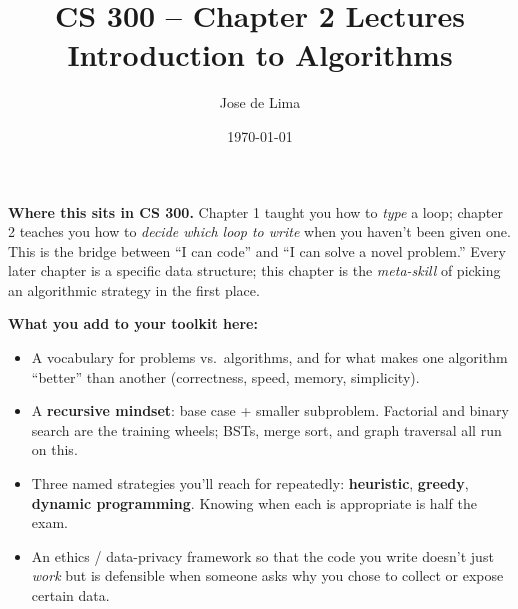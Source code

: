 \documentclass[11pt]{article}
\title{CS 300 -- Chapter 2 Lectures\\\large Introduction to Algorithms}
\author{Jose de Lima}
\date{\today}
\begin{document}
\maketitle

\begin{ideabox}
\textbf{Where this sits in CS 300.} Chapter 1 taught you how to \emph{type}
a loop; chapter 2 teaches you how to \emph{decide which loop to write} when
you haven't been given one. This is the bridge between ``I can code'' and
``I can solve a novel problem.'' Every later chapter is a specific data
structure; this chapter is the \emph{meta-skill} of picking an algorithmic
strategy in the first place.

\textbf{What you add to your toolkit here:}
\begin{itemize}
    \item A vocabulary for problems vs.\ algorithms, and for what makes
          one algorithm ``better'' than another (correctness, speed,
          memory, simplicity).
    \item A \textbf{recursive mindset}: base case + smaller subproblem.
          Factorial and binary search are the training wheels; BSTs,
          merge sort, and graph traversal all run on this.
    \item Three named strategies you'll reach for repeatedly:
          \textbf{heuristic}, \textbf{greedy}, \textbf{dynamic programming}.
          Knowing when each is appropriate is half the exam.
    \item An ethics / data-privacy framework so that the code you write
          doesn't just \emph{work} but is defensible when someone asks
          why you chose to collect or expose certain data.
\end{itemize}


\end{ideabox}
\end{document}
